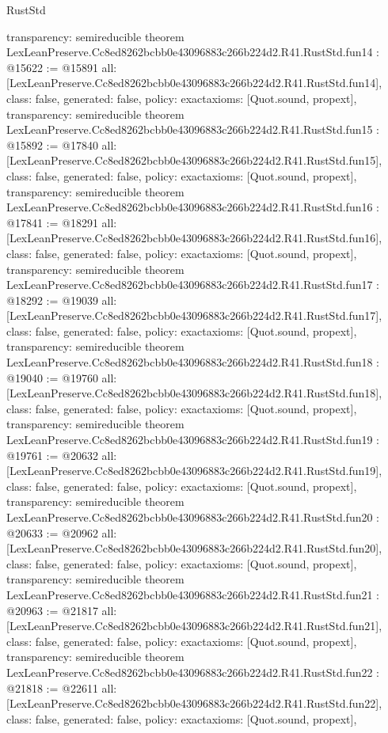 \begin{lexlean}{RustStd}
\begin{coremodule}
{  transparency: semireducible
}
theorem LexLeanPreserve.Cc8ed8262bcbb0e43096883c266b224d2.R41.RustStd.fun14 : @15622 := @15891 {
  all: [LexLeanPreserve.Cc8ed8262bcbb0e43096883c266b224d2.R41.RustStd.fun14],
  class: false,
  generated: false,
  policy: exact{axioms: [Quot.sound, propext]},
  transparency: semireducible
}
theorem LexLeanPreserve.Cc8ed8262bcbb0e43096883c266b224d2.R41.RustStd.fun15 : @15892 := @17840 {
  all: [LexLeanPreserve.Cc8ed8262bcbb0e43096883c266b224d2.R41.RustStd.fun15],
  class: false,
  generated: false,
  policy: exact{axioms: [Quot.sound, propext]},
  transparency: semireducible
}
theorem LexLeanPreserve.Cc8ed8262bcbb0e43096883c266b224d2.R41.RustStd.fun16 : @17841 := @18291 {
  all: [LexLeanPreserve.Cc8ed8262bcbb0e43096883c266b224d2.R41.RustStd.fun16],
  class: false,
  generated: false,
  policy: exact{axioms: [Quot.sound, propext]},
  transparency: semireducible
}
theorem LexLeanPreserve.Cc8ed8262bcbb0e43096883c266b224d2.R41.RustStd.fun17 : @18292 := @19039 {
  all: [LexLeanPreserve.Cc8ed8262bcbb0e43096883c266b224d2.R41.RustStd.fun17],
  class: false,
  generated: false,
  policy: exact{axioms: [Quot.sound, propext]},
  transparency: semireducible
}
theorem LexLeanPreserve.Cc8ed8262bcbb0e43096883c266b224d2.R41.RustStd.fun18 : @19040 := @19760 {
  all: [LexLeanPreserve.Cc8ed8262bcbb0e43096883c266b224d2.R41.RustStd.fun18],
  class: false,
  generated: false,
  policy: exact{axioms: [Quot.sound, propext]},
  transparency: semireducible
}
theorem LexLeanPreserve.Cc8ed8262bcbb0e43096883c266b224d2.R41.RustStd.fun19 : @19761 := @20632 {
  all: [LexLeanPreserve.Cc8ed8262bcbb0e43096883c266b224d2.R41.RustStd.fun19],
  class: false,
  generated: false,
  policy: exact{axioms: [Quot.sound, propext]},
  transparency: semireducible
}
theorem LexLeanPreserve.Cc8ed8262bcbb0e43096883c266b224d2.R41.RustStd.fun20 : @20633 := @20962 {
  all: [LexLeanPreserve.Cc8ed8262bcbb0e43096883c266b224d2.R41.RustStd.fun20],
  class: false,
  generated: false,
  policy: exact{axioms: [Quot.sound, propext]},
  transparency: semireducible
}
theorem LexLeanPreserve.Cc8ed8262bcbb0e43096883c266b224d2.R41.RustStd.fun21 : @20963 := @21817 {
  all: [LexLeanPreserve.Cc8ed8262bcbb0e43096883c266b224d2.R41.RustStd.fun21],
  class: false,
  generated: false,
  policy: exact{axioms: [Quot.sound, propext]},
  transparency: semireducible
}
theorem LexLeanPreserve.Cc8ed8262bcbb0e43096883c266b224d2.R41.RustStd.fun22 : @21818 := @22611 {
  all: [LexLeanPreserve.Cc8ed8262bcbb0e43096883c266b224d2.R41.RustStd.fun22],
  class: false,
  generated: false,
  policy: exact{axioms: [Quot.sound, propext]},
}
\end{coremodule}
\end{lexlean}
